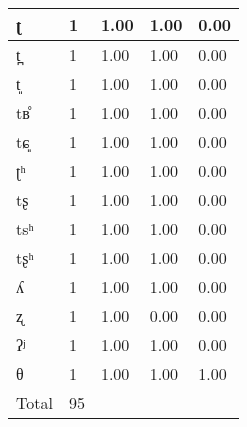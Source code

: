 \begin{longtable}{|l|l|l|l|l|}
ʈ        & 1     & 1.00    & 1.00   & 0.00  \\ \hline
t̪       & 1     & 1.00    & 1.00   & 0.00  \\ \hline
t͈       & 1     & 1.00    & 1.00   & 0.00  \\ \hline
tʙ̊      & 1     & 1.00    & 1.00   & 0.00  \\ \hline
tɕ͈      & 1     & 1.00    & 1.00   & 0.00  \\ \hline
ʈʰ       & 1     & 1.00    & 1.00   & 0.00  \\ \hline
tʂ       & 1     & 1.00    & 1.00   & 0.00  \\ \hline
tsʰ      & 1     & 1.00    & 1.00   & 0.00  \\ \hline
tʂʰ      & 1     & 1.00    & 1.00   & 0.00  \\ \hline
ʎ        & 1     & 1.00    & 1.00   & 0.00  \\ \hline
ʐ        & 1     & 1.00    & 0.00   & 0.00  \\ \hline
ʔʲ       & 1     & 1.00    & 1.00   & 0.00  \\ \hline
θ        & 1     & 1.00    & 1.00   & 1.00 \\ \hline
Total   & 95   &         &        &       \\ \hline
\end{longtable}